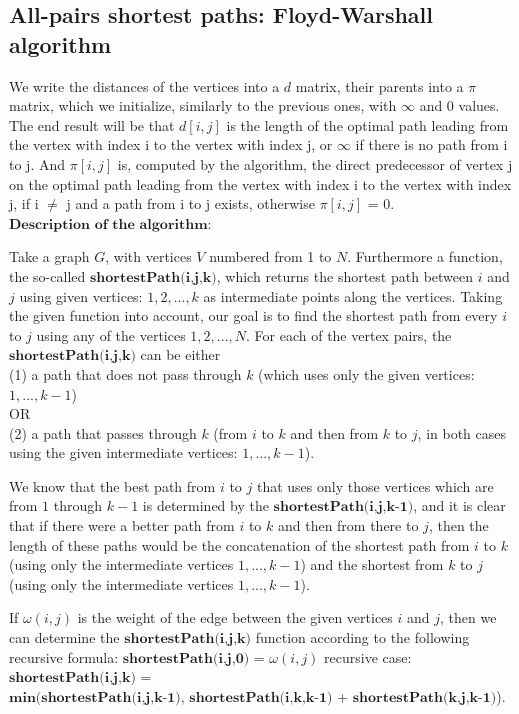 \documentclass[margin=0px]{article}
\begin{document}
\subsection{All-pairs shortest paths: Floyd-Warshall algorithm}

We write the distances of the vertices into a $d$ matrix, their parents into a $\pi$ matrix, which we initialize, similarly to the previous ones, with $\infty$ and 0 values. The end result will be that $d[i, j]$ is the length of the optimal path leading from the vertex with index i to the vertex with index j, or $\infty$ if there is no path from i to j. And $\pi[i, j]$ is, computed by the algorithm, the direct predecessor of vertex j on the optimal path leading from the vertex with index i to the vertex with index j, if i $\ne$ j and a path from i to j exists, otherwise $\pi[i, j]$ = 0.
$\textbf{Description of the algorithm:}$

Take a graph $G$, with vertices $V$ numbered from 1 to $N$. Furthermore a function, the so-called $\textbf{shortestPath(i,j,k)}$, which returns the shortest path between $i$ and $j$ using given vertices: ${1,2,...,k}$ as intermediate points along the vertices. Taking the given function into account, our goal is to find the shortest path from every $i$ to $j$ using any of the vertices ${1,2,...,N}$.
For each of the vertex pairs, the $\textbf{shortestPath(i,j,k)}$ can be either\\
(1) a path that does not pass through $k$ (which uses only the given vertices: ${1,...,k-1}$)\\
OR\\
(2) a path that passes through $k$ (from $i$ to $k$ and then from $k$ to $j$, in both cases using the given intermediate vertices: ${1,...,k-1}$).

We know that the best path from $i$ to $j$ that uses only those vertices which are from $1$ through $k-1$ is determined by the $\textbf{shortestPath(i,j,k-1)}$, and it is clear that if there were a better path from $i$ to $k$ and then from there to $j$, then the length of these paths would be the concatenation of the shortest path from $i$ to $k$ (using only the intermediate vertices ${1,...,k-1}$) and the shortest from $k$ to $j$ (using only the intermediate vertices ${1,...,k-1}$).

If $\omega(i,j)$ is the weight of the edge between the given vertices $i$ and $j$, then we can determine the $\textbf{shortestPath(i,j,k)}$ function according to the following recursive formula:
$\textbf{shortestPath(i,j,0)}$ = $\omega(i,j)$
recursive case:\\
$\textbf{shortestPath(i,j,k) =}$\\
$\textbf{min(shortestPath(i,j,k-1), shortestPath(i,k,k-1)}$ + $\textbf{shortestPath(k,j,k-1)}$).
\end{document}
